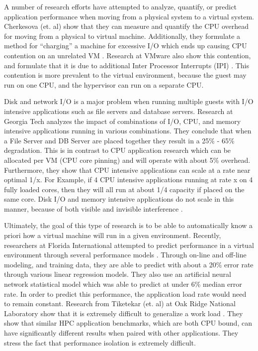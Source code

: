 A number of research efforts have attempted to analyze, quantify, or predict application performance when moving from a physical system to a virtual system.   Cherkesova (et. al) show that they can measure and quantify the CPU overhead for moving from a physical to virtual machine.  Additionally, they formulate a method for “charging” a machine for excessive I/O which ends up causing CPU contention on an unrelated VM \cite{cherkasova}.  Research at VMware also show this contention, and formulate that it is due to additional Inter Processor Interrupts (IPI) \cite{ahmad}.   This contention is more prevalent to the virtual environment, because the guest may run on one CPU, and the hypervisor can run on a separate CPU. 
 
\indent Disk and network I/O is a major problem when running multiple guests with I/O intensive applications such as file servers and database servers.  Research at Georgia Tech \cite{paul} analyzes the impact of combinations of I/O, CPU, and memory intensive applications running in various combinations.  They conclude that when a File Server and DB Server are placed together they result in a 25\% - 65\% degradation.  This is in contrast to CPU application research \cite{huber1, huber2} which can be allocated per VM (CPU core pinning) and will operate with about 5\% overhead.  Furthermore, they show that CPU intensive applications can scale at a rate near optimal 1/x.   For Example, if 4 CPU intensive applications running at rate x on 4 fully loaded cores, then they will all run at about 1/4 capacity if placed on the same core.   Disk I/O and memory intensive applications do not scale in this manner, because of both visible and invisible interference \cite{tickoo}.

\indent Ultimately, the goal of this type of research is to be able to automatically know a priori how a virtual machine will run in a given environment.  Recently, researchers at Florida International attempted to predict performance in a virtual environment through several performance models \cite{kundu}.  Through on-line and off-line modeling, and training data, they are able to predict with about a 20\% error rate through various linear regression models.  They also use an artificial neural network statistical model which was able to predict at under 6\% median error rate.   In order to predict this performance, the application load rate would need to remain constant.  Research from Tiketekar (et. al) at Oak Ridge National Laboratory show that it is extremely difficult to generalize a work load \cite{tikotekar}.  They show that similar HPC application benchmarks, which are both CPU bound, can have significantly different results when paired with other applications.  They stress the fact that performance isolation is extremely difficult.

